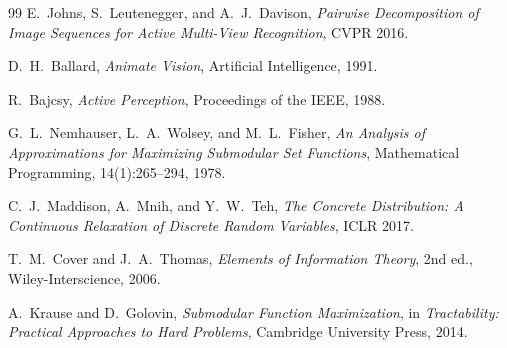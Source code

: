 \documentclass[11pt,a4paper]{article}
\begin{document}
\begin{thebibliography}{99}
E.~Johns, S.~Leutenegger, and A.~J.~Davison,
\textit{Pairwise Decomposition of Image Sequences for Active Multi-View Recognition},
CVPR 2016.

D.~H.~Ballard,
\textit{Animate Vision},
Artificial Intelligence, 1991.

R.~Bajcsy,
\textit{Active Perception},
Proceedings of the IEEE, 1988.

G.~L.~Nemhauser, L.~A.~Wolsey, and M.~L.~Fisher,
\textit{An Analysis of Approximations for Maximizing Submodular Set Functions},
Mathematical Programming, 14(1):265--294, 1978.

C.~J.~Maddison, A.~Mnih, and Y.~W.~Teh,
\textit{The Concrete Distribution: A Continuous Relaxation of Discrete Random Variables},
ICLR 2017.

T.~M.~Cover and J.~A.~Thomas,
\textit{Elements of Information Theory}, 2nd ed.,
Wiley-Interscience, 2006.

A.~Krause and D.~Golovin,
\textit{Submodular Function Maximization},
in \textit{Tractability: Practical Approaches to Hard Problems},
Cambridge University Press, 2014.

\end{thebibliography}
\end{document}
